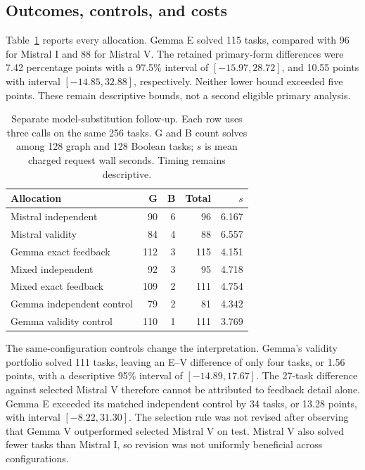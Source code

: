 \subsection{Outcomes, controls, and costs}

Table~\ref{tab:replacement} reports every allocation. Gemma E solved 115 tasks, compared with 96 for Mistral I and 88 for Mistral V. The retained primary-form differences were 7.42 percentage points with a 97.5\% interval of $[-15.97,28.72]$, and 10.55 points with interval $[-14.85,32.88]$, respectively. Neither lower bound exceeded five points. These remain descriptive bounds, not a second eligible primary analysis.

\begin{table}[t]
\caption{Separate model-substitution follow-up. Each row uses three calls on the same 256 tasks. G and B count solves among 128 graph and 128 Boolean tasks; $s$ is mean charged request wall seconds. Timing remains descriptive.}
\label{tab:replacement}
\centering\small\setlength{\tabcolsep}{3pt}
\begin{tabular}{lrrrr}
\toprule
Allocation & G & B & Total & $s$\\
\midrule
Mistral independent & 90 & 6 & 96 & 6.167\\
Mistral validity & 84 & 4 & 88 & 6.557\\
Gemma exact feedback & 112 & 3 & 115 & 4.151\\
Mixed independent & 92 & 3 & 95 & 4.718\\
Mixed exact feedback & 109 & 2 & 111 & 4.754\\
Gemma independent control & 79 & 2 & 81 & 4.342\\
Gemma validity control & 110 & 1 & 111 & 3.769\\
\bottomrule
\end{tabular}
\end{table}

The same-configuration controls change the interpretation. Gemma's validity portfolio solved 111 tasks, leaving an E--V difference of only four tasks, or 1.56 points, with a descriptive 95\% interval of $[-14.89,17.67]$. The 27-task difference against selected Mistral V therefore cannot be attributed to feedback detail alone. Gemma E exceeded its matched independent control by 34 tasks, or 13.28 points, with interval $[-8.22,31.30]$. The selection rule was not revised after observing that Gemma V outperformed selected Mistral V on test. Mistral V also solved fewer tasks than Mistral I, so revision was not uniformly beneficial across configurations.

